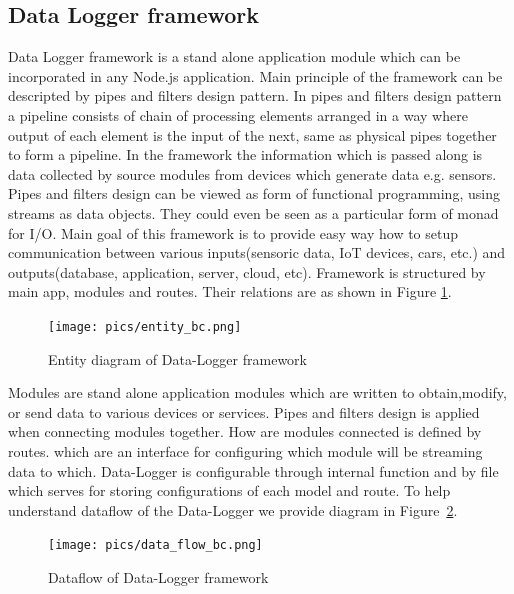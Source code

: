 \subsection{Data Logger framework} %
Data Logger framework is a stand alone application module which can be incorporated in any Node.js application. Main principle of the framework can be descripted by pipes and filters design pattern. In pipes and filters design pattern a pipeline consists of chain of processing elements arranged in a way where output of each element is the input of the next, same as physical pipes together to form a pipeline. In the framework the information which is passed along is data collected by source modules from devices which generate data e.g. sensors. Pipes and filters design can be viewed as form of functional programming, using streams as data objects. They could even be seen as a particular form of monad for I/O\cite{monad_pipe}. Main goal of this framework is to provide easy way how to setup communication between various inputs(sensoric data, IoT devices, cars, etc.) and outputs(database, application, server, cloud, etc). Framework is structured by main app, modules and routes. Their relations are as shown in Figure \ref{fig:entity_pc}.
\begin{figure}[H]
\begin{center}
\captionsetup{font=small}
\texttt{[image: pics/entity\_bc.png]}
\caption{Entity diagram of Data-Logger framework}
\label{fig:entity_pc}
\end{center}
\end{figure}
 Modules are stand alone application modules which are written to obtain,modify, or send data to various devices or services. Pipes and filters design is applied when connecting modules together. How are modules connected is defined by routes. which are an interface for configuring which module will be streaming data to which. Data-Logger is configurable through internal function and by file which serves for storing configurations of each model and route. To help understand dataflow of the Data-Logger we provide diagram in Figure~\ref{fig:dataflow}.
 \begin{figure}[H]
\begin{center}
\captionsetup{font=small}
\texttt{[image: pics/data\_flow\_bc.png]}
\caption{Dataflow of Data-Logger framework}
\label{fig:dataflow}
\end{center}
\end{figure}
